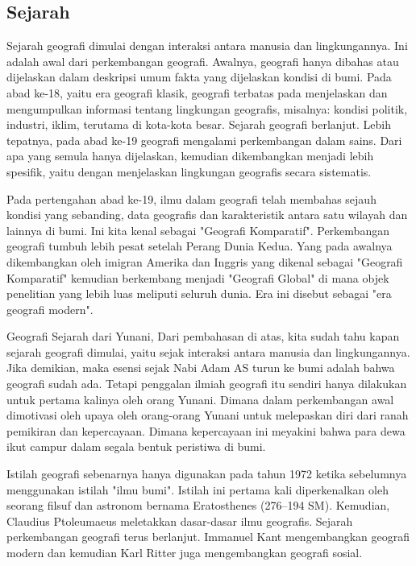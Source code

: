 \subsection{Sejarah}
Sejarah geografi dimulai dengan interaksi antara manusia dan lingkungannya. Ini adalah awal dari perkembangan geografi.
Awalnya, geografi hanya dibahas atau dijelaskan dalam deskripsi umum fakta yang dijelaskan kondisi di bumi. Pada abad ke-18, yaitu era geografi klasik, geografi terbatas pada menjelaskan dan mengumpulkan informasi tentang lingkungan geografis, misalnya: kondisi politik, industri, iklim, terutama di kota-kota besar. Sejarah geografi berlanjut. Lebih tepatnya, pada abad ke-19 geografi mengalami perkembangan dalam sains. Dari apa yang semula hanya dijelaskan, kemudian dikembangkan menjadi lebih spesifik, yaitu dengan menjelaskan lingkungan geografis secara sistematis. \hfill\break

Pada pertengahan abad ke-19, ilmu dalam geografi telah membahas sejauh kondisi yang sebanding, data geografis dan karakteristik antara satu wilayah dan lainnya di bumi. Ini kita kenal sebagai "Geografi Komparatif". Perkembangan geografi tumbuh lebih pesat setelah Perang Dunia Kedua. Yang pada awalnya dikembangkan oleh imigran Amerika dan Inggris yang dikenal sebagai "Geografi Komparatif" kemudian berkembang menjadi "Geografi Global" di mana objek penelitian yang lebih luas meliputi seluruh dunia. Era ini disebut sebagai "era geografi modern". \hfill\break

Geografi Sejarah dari Yunani, Dari pembahasan di atas, kita sudah tahu kapan sejarah geografi dimulai, yaitu sejak interaksi antara manusia dan lingkungannya. Jika demikian, maka esensi sejak Nabi Adam AS turun ke bumi adalah bahwa geografi sudah ada. Tetapi penggalan ilmiah geografi itu sendiri hanya dilakukan untuk pertama kalinya oleh orang Yunani. Dimana dalam perkembangan awal dimotivasi oleh upaya oleh orang-orang Yunani untuk melepaskan diri dari ranah pemikiran dan kepercayaan. Dimana kepercayaan ini meyakini bahwa para dewa ikut campur dalam segala bentuk peristiwa di bumi. \hfill\break

Istilah geografi sebenarnya hanya digunakan pada tahun 1972 ketika sebelumnya menggunakan istilah "ilmu bumi". Istilah ini pertama kali diperkenalkan oleh seorang filsuf dan astronom bernama Eratosthenes (276–194 SM). Kemudian, Claudius Ptoleumaeus meletakkan dasar-dasar ilmu geografis. Sejarah perkembangan geografi terus berlanjut. Immanuel Kant mengembangkan geografi modern dan kemudian Karl Ritter juga mengembangkan geografi sosial. \hfill\break


